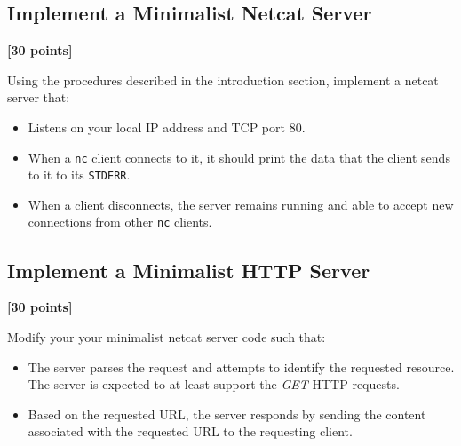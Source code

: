\documentclass[pdftex,12pt,a4paper]{article}
\begin{document}
        \subsection{Implement a Minimalist Netcat Server}
            \begin{flushright}
                \textbf{[30 points]}
            \end{flushright}

            Using the procedures described in the introduction section, implement a netcat server that:
            \begin{itemize}
                \item Listens on your local IP address and TCP port 80.
                \item When a \texttt{nc} client connects to it, it should print
                    the data that the client sends to it to its \texttt{STDERR}.
                \item When a client disconnects, the server remains running and
                    able to accept new connections from other \texttt{nc} clients.
            \end{itemize}

        \subsection{Implement a Minimalist HTTP Server}
            \begin{flushright}
                \textbf{[30 points]}
            \end{flushright}

            Modify your your minimalist netcat server code such that:
            \begin{itemize}
                \item The server parses the request and attempts to identify
                    the requested resource. The server is expected to at least
                    support the \emph{GET} HTTP requests. 
                \item Based on the requested URL, the server responds by
                    sending the content associated with the requested URL to
                    the requesting client.
                \end{itemize}
\end{document}
